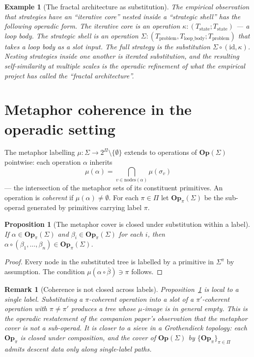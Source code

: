 \documentclass[11pt]{article}
\newtheorem{proposition}{Proposition}
\newtheorem{remark}{Remark}
\newtheorem{example}{Example}
\begin{document}
\begin{example}[The fractal architecture as substitution]
The empirical observation that strategies have an ``iterative core''
nested inside a ``strategic shell'' has the following operadic form.
The iterative core is an operation $\kappa :
(T_{\mathrm{state}}; T_{\mathrm{state}})$ — a loop body. The
strategic shell is an operation $\Sigma :
(T_{\mathrm{problem}}, T_{\mathrm{loop\_body}}; T_{\mathrm{problem}})$
that takes a loop body as a slot input. The full strategy is the
substitution $\Sigma \circ (\mathrm{id}, \kappa)$. Nesting strategies
inside one another is iterated substitution, and the resulting
self-similarity at multiple scales is the operadic refinement of what
the empirical project has called the ``fractal architecture''.
\end{example}

\section{Metaphor coherence in the operadic setting}

The metaphor labelling $\mu : \Sigma \to 2^\Pi \setminus \{\emptyset\}$
extends to operations of $\mathbf{Op}(\Sigma)$ pointwise: each
operation $\alpha$ inherits
\[
\mu(\alpha) = \bigcap_{v \in \mathrm{nodes}(\alpha)} \mu(\sigma_v)
\]
— the intersection of the metaphor sets of its constituent
primitives. An operation is \emph{coherent} if $\mu(\alpha) \ne
\emptyset$. For each $\pi \in \Pi$ let $\mathbf{Op}_\pi(\Sigma)$ be
the sub-operad generated by primitives carrying label $\pi$.

\begin{proposition}[The metaphor cover is closed under substitution
within a label]
\label{prop:cover-closure}
If $\alpha \in \mathbf{Op}_\pi(\Sigma)$ and $\beta_i \in
\mathbf{Op}_\pi(\Sigma)$ for each $i$, then $\alpha \circ (\beta_1,
\dots, \beta_n) \in \mathbf{Op}_\pi(\Sigma)$.
\end{proposition}

\begin{proof}
Every node in the substituted tree is labelled by a primitive in
$\Sigma^\pi$ by assumption. The condition $\mu(\alpha \circ \bar{\beta})
\ni \pi$ follows.
\end{proof}

\begin{remark}[Coherence is not closed across labels]
Proposition~\ref{prop:cover-closure} is local to a single label.
Substituting a $\pi$-coherent operation into a slot of a
$\pi'$-coherent operation with $\pi \ne \pi'$ produces a tree whose
$\mu$-image is in general empty. This is the operadic restatement of
the companion paper's observation that the metaphor cover is not a
sub-operad. It is closer to a sieve in a Grothendieck topology: each
$\mathbf{Op}_\pi$ is closed under composition, and the cover of
$\mathbf{Op}(\Sigma)$ by $\{\mathbf{Op}_\pi\}_{\pi \in \Pi}$ admits
descent data only along single-label paths.
\end{remark}
\end{document}
